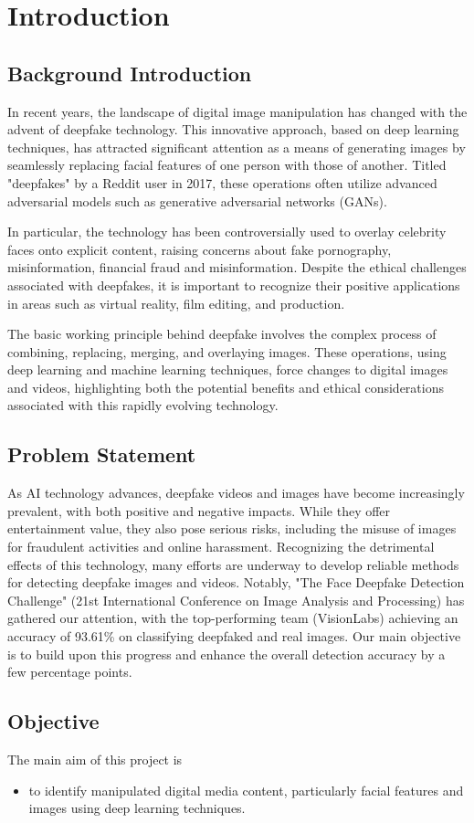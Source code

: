 \chapter{Introduction}
    \section{Background Introduction}
        In recent years, the landscape of digital image manipulation has changed with the advent of deepfake technology.
        This innovative approach, based on deep learning techniques, has attracted significant attention as a means of generating images by seamlessly replacing facial features of one person with those of another.
        Titled "deepfakes" by a Reddit user in 2017, these operations often utilize advanced adversarial models such as generative adversarial networks (GANs). \cite{st2022deep}

        In particular, the technology has been controversially used to overlay celebrity faces onto explicit content, raising concerns about fake pornography, misinformation, financial fraud and misinformation.
        Despite the ethical challenges associated with deepfakes, it is important to recognize their positive applications in areas such as virtual reality, film editing, and production.

        The basic working principle behind deepfake involves the complex process of combining, replacing, merging,  and overlaying images.
        These operations, using deep learning and machine learning techniques, force changes to digital images and videos, highlighting both the potential benefits and ethical considerations associated with this rapidly evolving technology.


    \section{Problem Statement}
        As AI technology advances, deepfake videos and images have become increasingly prevalent, with both positive and negative impacts. While they offer entertainment value, they also pose serious risks, including the misuse of images for fraudulent activities and online harassment. Recognizing the detrimental effects of this technology, many efforts are underway to develop reliable methods for detecting deepfake images and videos. Notably, "The Face Deepfake Detection Challenge" (21st International Conference on Image Analysis and Processing) \cite{jimaging8100263} has gathered our attention, with the top-performing team (VisionLabs) achieving an accuracy of 93.61\% on classifying deepfaked and real images. Our main objective is to build upon this progress and enhance the overall detection accuracy by a few percentage points.

    \section{Objective}
        The main aim of this project is 
        \begin{itemize}
            \item to identify manipulated digital media content, particularly facial features and images using deep learning techniques.
        \end{itemize}